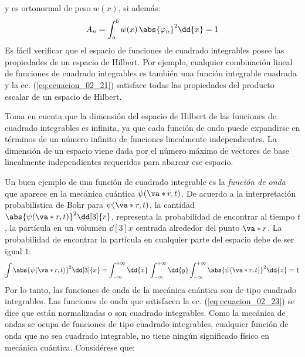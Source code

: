 y es ortonormal de peso $w(x)$, si además:
\begin{align*}
A_{n} = \int_{a}^{b} w(x) \, \abs{\varphi_{n}}^{2} \dd{x} = 1
\end{align*}
\vfill{}
Es fácil verificar que el espacio de funciones de cuadrado integrables posee las propiedades de un espacio de Hilbert. Por ejemplo, cualquier combinación lineal de funciones de cuadrado integrables es también una función integrable cuadrada y la ec. (\ref{eq:ecuacion_02_21}) satisface todas las propiedades del producto escalar de un espacio de Hilbert.
\par
Toma en cuenta que la dimensión del espacio de Hilbert de las funciones de cuadrado integrables es infinita, ya que cada función de onda puede expandirse en términos de un número infinito de funciones linealmente independientes. La dimensión de un espacio viene dada por el número máximo de vectores de base linealmente independientes requeridos para abarcar ese espacio.
\par
Un buen ejemplo de una función de cuadrado integrable es la \emph{función de onda} que aparece en la mecánica cuántica $\psi (\va*{r}, t)$. De acuerdo a la interpretación probabilística de Bohr para $\psi (\va*{r}, t)$, la cantidad $\abs{\psi (\va*{r}, t)}^{2} \dd[3]{r}$, representa la probabilidad de encontrar al tiempo $t$, la partícula en un volumen $\dd[3]{x}$ centrada alrededor del punto $\va*{r}$. La probabilidad de encontrar la partícula en cualquier parte del espacio debe de ser igual $1$:
\begin{equation}
\int \abs{\psi (\va*{r}, t)}^{2} \dd[3]{x} = \int_{-\infty}^{+\infty} \dd{x} \, \int_{-\infty}^{+\infty} \dd{y} \int_{-\infty}^{+\infty} \abs{\psi (\va*{r}, t)}^{2} \dd{z} = 1
\label{eq:ecuacion_02_23}
\end{equation}
Por lo tanto, las funciones de onda de la mecánica cuántica son de tipo cuadrado integrables. Las funciones de onda que satisfacen la ec. (\ref{eq:ecuacion_02_23}) se dice que están normalizadas o son cuadrado integrables. Como la mecánica de ondas se ocupa de funciones de tipo cuadrado integrables, cualquier función de onda que no sea cuadrado integrable, no tiene ningún significado físico en mecánica cuántica.
\vfill{}
Considérese que:
